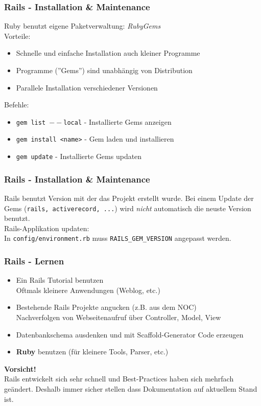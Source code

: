 \begin{frame}
  \frametitle{Rails - Installation \& Maintenance}
  Ruby benutzt eigene Paketverwaltung: \emph{RubyGems} \\
  \vspace{0.3cm}
  Vorteile:
  \begin{itemize}
    \item Schnelle und einfache Installation auch kleiner Programme
    \item Programme (''Gems'') sind unabhängig von Distribution
    \item Parallele Installation verschiedener Versionen
  \end{itemize}
  \vspace{0.3cm}
  Befehle:
  \begin{itemize}
    \item {\tt gem list $--$local} - Installierte Gems anzeigen
    \item {\tt gem install <name>} - Gem laden und installieren
    \item {\tt gem update} - Installierte Gems updaten
  \end{itemize}
\end{frame}

\begin{frame}
  \frametitle{Rails - Installation \& Maintenance}
  Rails benutzt Version mit der das Projekt erstellt wurde. Bei einem
  Update der Gems ({\tt rails, activerecord, ...}) wird \emph{nicht} automatisch
  die neuste Version benutzt. \\
  \vspace{0.3cm}
  Rails-Applikation updaten: \\
  \vspace{0.2cm}
  In {\tt config/environment.rb} muss {\tt RAILS\_GEM\_VERSION} angepasst werden.
\end{frame}

\begin{frame}
  \frametitle{Rails - Lernen}
  \begin{itemize}
    \item Ein Rails Tutorial benutzen \\ Oftmals kleinere Anwendungen (Weblog, etc.)
    \item Bestehende Rails Projekte angucken (z.B. aus dem NOC) \\ Nachverfolgen von Webseitenaufruf über Controller, Model, View
    \item Datenbankschema ausdenken und mit Scaffold-Generator Code erzeugen
    \item {\bf Ruby} benutzen (für kleinere Tools, Parser, etc.)
  \end{itemize}
  \vspace{0.5cm}
  {\bf Vorsicht!}\\
  Rails entwickelt sich sehr schnell und Best-Practices haben sich mehrfach geändert. Deshalb immer 
  sicher stellen dass Dokumentation auf aktuellem Stand ist.
\end{frame}


